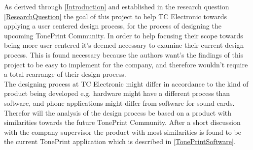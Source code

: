 
As derived through \autoref{Introduction} and established in the research question \autoref{ResearchQuestion} the goal of this project to help TC Electronic towards applying a user centered design process, for the process of designing the upcoming TonePrint Community. In order to help focusing their scope towards being more user centered it's deemed necessary to examine their current design process. This is found necessary because the authors want's the findings of this project to be easy to implement for the company, and therefore wouldn't require a total rearrange of their design process. \\
The designing process at TC Electronic might differ in accordance to the kind of product being developed e.g. hardware might have a different process than software, and  phone applications might differ from software for sound cards. Therefor will the analysis of the design process be based on a product with similarities towards the future TonePrint Community. After a short discussion with the company supervisor the product with most similarities is found to be the current TonePrint application which is described in \autoref{TonePrintSoftware}. 

